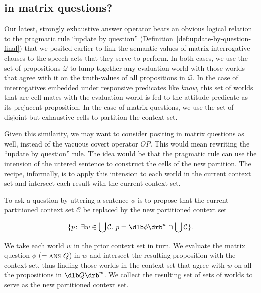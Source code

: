\subsection{\ans in matrix questions?}
\label{sec:matrix-ans}

Our latest, strongly exhaustive answer operator bears an obvious logical
relation to the pragmatic rule ``update by question''
(Definition~\ref{def:update-by-question-final}) that we posited earlier to link
the semantic values of matrix interrogative clauses to the speech acts that they
serve to perform. In both cases, we use the set of propositions $\mathcal{Q}$ to
lump together any evaluation world with those worlds that agree with it on the
truth-values of all propositions in $\mathcal{Q}$. In the case of interrogatives
embedded under responsive predicates like \emph{know}, this set of worlds that
are cell-mates with the evaluation world is fed to the attitude predicate as its
prejacent proposition. In the case of matrix questions, we use the set of
disjoint but exhaustive cells to partition the context set.

Given this similarity, we may want to consider positing \ans in matrix questions
as well, instead of the vacuous covert operator $OP$. This would mean rewriting
the ``update by question'' rule. The idea would be that the pragmatic rule can
use the intension of the uttered sentence to construct the cells of the new
partition. The recipe, informally, is to apply this intension to each world in
the current context set and intersect each result with the current context set.

\begin{definition}\label{def:updatebyquestiondraftrevision}%
  To ask a question by uttering a sentence $\phi$ is to propose that the current
  partitioned context set $\mathcal{C}$ be replaced by the new partitioned
  context set

\[\{p\co \exists w\in\bigcup\mathcal{C}.\ p = \sv{\phi}^{w}\cap \bigcup\mathcal{C}\}.\]

\end{definition}
%
We take each world $w$ in the prior context set in turn. We evaluate the matrix
question $\phi$ ($= \textsc{ans}\ Q$) in $w$ and intersect the resulting proposition
with the context set, thus finding those worlds in the context set that agree
with $w$ on all the propositions in $\sv{Q}^{w}$. We collect the resulting set
of sets of worlds to serve as the new partitioned context set.

